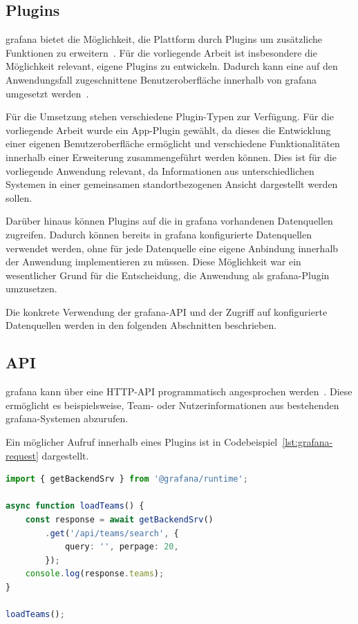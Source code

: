 \subsection{Plugins}
\label{subsec:grafana-plugins}

\gls{grafana} bietet die Möglichkeit, die Plattform durch Plugins um
zusätzliche Funktionen zu erweitern~\cite{grafana2026pluginmanagement}.
Für die vorliegende Arbeit ist insbesondere die Möglichkeit relevant,
eigene Plugins zu entwickeln. Dadurch kann eine auf den Anwendungsfall
zugeschnittene Benutzeroberfläche innerhalb von \gls{grafana} umgesetzt
werden~\cite{grafana2026plugintutorials}.

Für die Umsetzung stehen verschiedene Plugin-Typen zur Verfügung. Für
die vorliegende Arbeit wurde ein App-Plugin gewählt, da dieses die
Entwicklung einer eigenen Benutzeroberfläche ermöglicht und verschiedene
Funktionalitäten innerhalb einer Erweiterung zusammengeführt werden
können. Dies ist für die vorliegende Anwendung relevant, da Informationen
aus unterschiedlichen Systemen in einer gemeinsamen standortbezogenen
Ansicht dargestellt werden sollen.

Darüber hinaus können Plugins auf die in \gls{grafana} vorhandenen
Datenquellen zugreifen. Dadurch können bereits in \gls{grafana}
konfigurierte Datenquellen verwendet werden, ohne für jede Datenquelle
eine eigene Anbindung innerhalb der Anwendung implementieren zu müssen.
Diese Möglichkeit war ein wesentlicher Grund für die Entscheidung,
die Anwendung als \gls{grafana}-Plugin umzusetzen.

Die konkrete Verwendung der \gls{grafana}-API und der Zugriff auf
konfigurierte Datenquellen werden in den folgenden Abschnitten
beschrieben.

\subsection{API}
\label{subsec:grafana-api}

\gls{grafana} kann über eine HTTP-API programmatisch angesprochen werden~\cite{grafana2026httpapi}. 
Diese ermöglicht es beispielsweise, Team- oder Nutzerinformationen aus bestehenden 
\gls{grafana}-Systemen abzurufen.

Ein möglicher Aufruf innerhalb eines Plugins ist in Codebeispiel~\ref{lst:grafana-request}
dargestellt.

\begin{lstlisting}[language=Typescript, caption={Abrufen von Teaminformationen über die Grafana-API}, label={lst:grafana-request}] 
import { getBackendSrv } from '@grafana/runtime';

async function loadTeams() {
    const response = await getBackendSrv()
        .get('/api/teams/search', {
            query: '', perpage: 20,
        });
    console.log(response.teams);
}

loadTeams();
\end{lstlisting}

